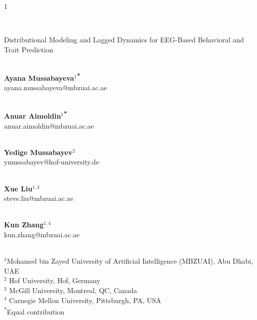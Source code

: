 \documentclass[12pt]{article}
\begin{document}
\hspace{13.9cm}1

\ \vspace{20mm}\\

\begin{center}{\LARGE Distributional Modeling and Lagged Dynamics for EEG-Based Behavioral and Trait Prediction}
\end{center}

\ \\
{\bf \large Ayana Mussabayeva$^{1}$\textsuperscript{*}}\\
ayana.mussabayeva@mbzuai.ac.ae

\ \\ {\bf \large Anuar Aimoldin$^{1}$\textsuperscript{*}}\\
anuar.aimoldin@mbzuai.ac.ae




\ \\ {\bf \large Yedige Mussabayev$^{\displaystyle 2}$}\\
ymussabayev@hof-university.de

\ \\ {\bf \large Xue Liu$^{\displaystyle 1, 3}$}\\
steve.liu@mbzuai.ac.ae

\ \\ {\bf \large Kun Zhang$^{\displaystyle 1, 4}$}\\
kun.zhang@mbzuai.ac.ae


\ \\
{$^{\displaystyle 1}$Mohamed bin Zayed University of Artificial Intelligence (MBZUAI), Abu Dhabi, UAE}
\ \\
{$^{\displaystyle 2}$ Hof University, Hof, Germany}
\ \\
{$^{\displaystyle 3}$ McGill University, Montreal, QC, Canada}
\ \\
{$^{\displaystyle 4}$ Carnegie Mellon University, Pittsburgh, PA, USA}
\ \\
{\normalsize \textsuperscript{*}Equal contribution}\\
\end{document}
